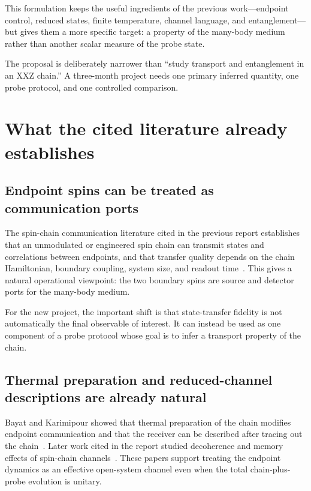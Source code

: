 \documentclass[11pt,a4paper]{article}
\begin{document}
This formulation keeps the useful ingredients of the previous work---endpoint control, reduced states, finite temperature, channel language, and entanglement---but gives them a more specific target: a property of the many-body medium rather than another scalar measure of the probe state.

The proposal is deliberately narrower than ``study transport and entanglement in an XXZ chain.''  A three-month project needs one primary inferred quantity, one probe protocol, and one controlled comparison.

\section{What the cited literature already establishes}

\subsection{Endpoint spins can be treated as communication ports}
The spin-chain communication literature cited in the previous report establishes that an unmodulated or engineered spin chain can transmit states and correlations between endpoints, and that transfer quality depends on the chain Hamiltonian, boundary coupling, system size, and readout time~\cite{bose2003,christandl2004,christandl2005,osborne2004,subrahmanyam2004,bose2007}.  This gives a natural operational viewpoint: the two boundary spins are source and detector ports for the many-body medium.

For the new project, the important shift is that state-transfer fidelity is not automatically the final observable of interest.  It can instead be used as one component of a probe protocol whose goal is to infer a transport property of the chain.

\subsection{Thermal preparation and reduced-channel descriptions are already natural}
Bayat and Karimipour showed that thermal preparation of the chain modifies endpoint communication and that the receiver can be described after tracing out the chain~\cite{bayat2005}.  Later work cited in the report studied decoherence and memory effects of spin-chain channels~\cite{cai2006,bayat2008}.  These papers support treating the endpoint dynamics as an effective open-system channel even when the total chain-plus-probe evolution is unitary.
\end{document}
